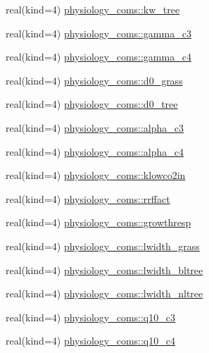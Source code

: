 \begin{DoxyCompactItemize}
\item 
real(kind=4) \hyperlink{namespacephysiology__coms_a840f4a14063bfd729e0882aa41a6196b}{physiology\+\_\+coms\+::kw\+\_\+tree}
\item 
real(kind=4) \hyperlink{namespacephysiology__coms_a1047d70553211a06c4db8b3b91ac9a5a}{physiology\+\_\+coms\+::gamma\+\_\+c3}
\item 
real(kind=4) \hyperlink{namespacephysiology__coms_a0fb188e6eb592e66650e7469f3526a2e}{physiology\+\_\+coms\+::gamma\+\_\+c4}
\item 
real(kind=4) \hyperlink{namespacephysiology__coms_a8bb7a49b5a368f444b440a6878908c54}{physiology\+\_\+coms\+::d0\+\_\+grass}
\item 
real(kind=4) \hyperlink{namespacephysiology__coms_af966fde8e82305bfc1939ab7548ba424}{physiology\+\_\+coms\+::d0\+\_\+tree}
\item 
real(kind=4) \hyperlink{namespacephysiology__coms_a3fa7397dce5d85afa000532d34a4f7e1}{physiology\+\_\+coms\+::alpha\+\_\+c3}
\item 
real(kind=4) \hyperlink{namespacephysiology__coms_a5b916ce98d80dbff5597fd7e218d35f7}{physiology\+\_\+coms\+::alpha\+\_\+c4}
\item 
real(kind=4) \hyperlink{namespacephysiology__coms_ae6137ce76e93cc9c6986bd1641276b83}{physiology\+\_\+coms\+::klowco2in}
\item 
real(kind=4) \hyperlink{namespacephysiology__coms_a0cce0fce32e96abbe4ab367ae4fd4578}{physiology\+\_\+coms\+::rrffact}
\item 
real(kind=4) \hyperlink{namespacephysiology__coms_a5575f4930196b79858fdc164b6d0bd21}{physiology\+\_\+coms\+::growthresp}
\item 
real(kind=4) \hyperlink{namespacephysiology__coms_aa11c93814b8de74595fe8516e0d901c1}{physiology\+\_\+coms\+::lwidth\+\_\+grass}
\item 
real(kind=4) \hyperlink{namespacephysiology__coms_a3f61c909c2342759478b025ea41f3125}{physiology\+\_\+coms\+::lwidth\+\_\+bltree}
\item 
real(kind=4) \hyperlink{namespacephysiology__coms_ac742bd74ce70f657609660f309eb9853}{physiology\+\_\+coms\+::lwidth\+\_\+nltree}
\item 
real(kind=4) \hyperlink{namespacephysiology__coms_aebfbdd7137fa93ba69de3a2ea7936c50}{physiology\+\_\+coms\+::q10\+\_\+c3}
\item 
real(kind=4) \hyperlink{namespacephysiology__coms_a58329d760ae671f7fa6b1b1854bd3bce}{physiology\+\_\+coms\+::q10\+\_\+c4}
\item 

\end{DoxyCompactItemize}
